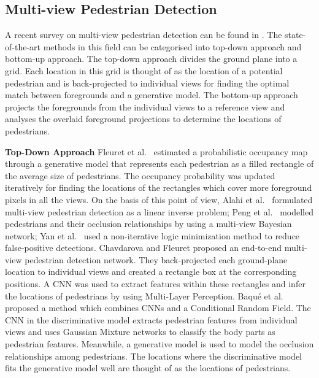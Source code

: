 \documentclass[runningheads]{llncs}
\begin{document}
	\subsection{Multi-view Pedestrian Detection}
	A recent survey on multi-view pedestrian detection can be found in \cite{Qiu_book2022}. The state-of-the-art methods in this field can be categorised into top-down approach and bottom-up approach. The top-down approach divides the ground plane into a grid. Each location in this grid is thought of as the location of a potential pedestrian and is back-projected to individual views for finding the optimal match between foregrounds and a generative model. The bottom-up approach projects the foregrounds from the individual views to a reference view and analyses the overlaid foreground projections to determine the locations of pedestrians.
	
	
	\textbf{Top-Down Approach}
	Fleuret et al.~\cite{fleuret2007multicamera} estimated a probabilistic occupancy map through a generative model that represents each pedestrian as a filled rectangle of the average size of pedestrians. The occupancy probability was updated iteratively for finding the locations of the rectangles which cover more foreground pixels in all the views.
	On the basis of this point of view, Alahi et al.~\cite{alahi2011sparsity} formulated multi-view pedestrian detection as a linear inverse problem; Peng et al.~\cite{peng2015robust} modelled pedestrians and their occlusion relationships by using a multi-view Bayesian network; Yan et al.~\cite{yan2021multicamera} used a non-iterative logic minimization method to reduce false-positive detections.
Chavdarova and Fleuret \cite{chavdarova2017deep} proposed an end-to-end multi-view pedestrian detection network. They back-projected each ground-plane location to individual views and created a rectangle box at the corresponding positions. A CNN was used to extract features within these rectangles and infer the locations of pedestrians by using Multi-Layer Perception. Baqu{\'e} et al.~\cite{baque2017deep} proposed a method which combines CNNs and a Conditional Random Field. The CNN in the discriminative model extracts pedestrian features from individual views and uses Gaussian Mixture networks to classify the body parts as pedestrian features. Meanwhile, a generative model is used to model the occlusion relationships among pedestrians. The locations where the discriminative model fits the generative model well are thought of as the locations of pedestrians.
	
\end{document}
